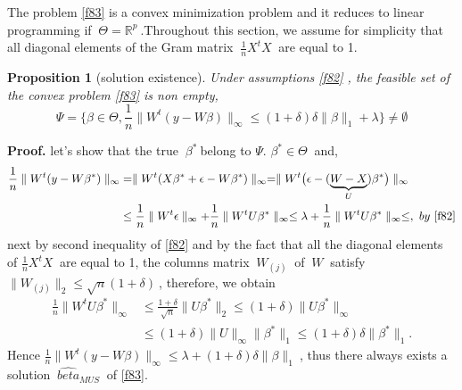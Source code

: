 \documentclass[12pt]{report}
\newtheorem {proposition}{Proposition}[section]  %
\begin{document}
The problem \eqref{f83} is a convex minimization problem and it reduces to linear programming if $\ \Theta=\mathbb{R}^{p}\ $.Throughout this section, we assume for simplicity that all diagonal elements of the Gram matrix $\ \frac{1}{n}X^{t}X\ $ are equal to 1.\
\begin{proposition}[solution existence]
	Under assumptions \eqref{f82} , the feasible set of the convex problem  \eqref{f83} is non empty,
	\begin{equation}
		\Psi=\bigg\{\beta\in \Theta, \frac{1}{n}\parallel W^{t}(y-W\beta)\parallel_{\infty}\leq (1+\delta)\delta\parallel\beta\parallel_{1}+\lambda\bigg\}\neq \emptyset
		\label{f84}
	\end{equation}	
\end{proposition}
\textbf{Proof.} let's show that the true $\ \beta^{\ast}\ $belong to $\Psi$. $\beta^{\ast}\in \Theta\ $ and,
\begin{align*}
\frac{1}{n}\parallel W^{t}(y-W\beta^{\ast})\parallel_{\infty}&=\parallel W^{t}(X\beta^{\ast}+\epsilon -W\beta^{\ast})\parallel_{\infty}=\parallel W^{t}\big(\epsilon -(\underbrace{W-X}_{U})\beta^{\ast}\big)\parallel_{\infty}\\
&\leq \frac{1}{n}\parallel W^{t}\epsilon\parallel_{\infty}+\frac{1}{n}\parallel W^{t}U\beta^{\ast}\parallel_{\infty}\leq \lambda + \frac{1}{n}\parallel W^{t}U\beta^{\ast}\parallel_{\infty}\leq ,\ by\ \eqref{f82}
\end{align*}
next by second inequality of \eqref{f82} and by the fact that all the diagonal elements of $\frac{1}{n}X^{t}X\ $  are equal to 1, the columns matrix $\ W_{(j)}\ $ of $\ W\ $ satisfy $\parallel W_{(j)}\parallel_{2}\leq\sqrt{n}(1+\delta)\ $, therefore, we obtain
\begin{align*}
\frac{1}{n}\parallel W^{t}U\beta^{\ast}\parallel_{\infty}&\leq\frac{1+\delta}{\sqrt{n}}\parallel U\beta^{\ast}\parallel_{2}	\leq (1+\delta)\parallel U\beta^{\ast}\parallel_{\infty}\\
&\leq (1+\delta)\parallel U \parallel_{\infty}\parallel \beta^{\ast}\parallel_{1}\leq  (1+\delta)\delta\parallel \beta^{\ast}\parallel_{1}.
\end{align*}
 Hence $\frac{1}{n}\parallel W^{t}(y-W\beta)\parallel_{\infty}\leq\lambda+ (1+\delta)\delta\parallel\beta\parallel_{1}\ $, thus there always exists a solution $\ \hat{beta}_{MUS}\ $ of \eqref{f83}.
 
\end{document}
